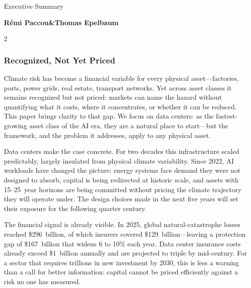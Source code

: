 \clearpage\thispagestyle{chapterstart}

\vspace*{-16mm}
{\displayfont\fontsize{28}{32}\selectfont\color{SEGreen}Executive Summary\par}
\vspace{0.5mm}
{\fontsize{8}{10}\selectfont\bfseries\color{SEBlack}R\'{e}mi Paccou\enspace\textnormal{\&}\enspace Thomas Epelbaum\par}
\vspace{1.5mm}

\begin{multicols}{2}
\setlength{\parskip}{1pt}

\subsubsection*{Recognized, Not Yet Priced}

\noindent Climate risk has become a financial variable for every physical asset---factories, ports, power grids, real estate, transport networks. Yet across asset classes it remains recognized but not priced: markets can name the hazard without quantifying what it costs, where it concentrates, or whether it can be reduced. This paper brings clarity to that gap. We focus on data centers: as the fastest-growing asset class of the AI era, they are a natural place to start---but the framework, and the problem it addresses, apply to any physical asset.

Data centers make the case concrete. For two decades this infrastructure scaled predictably, largely insulated from physical climate variability. Since 2022, AI workloads have changed the picture: energy systems face demand they were not designed to absorb, capital is being redirected at historic scale, and assets with 15--25~year horizons are being committed without pricing the climate trajectory they will operate under. The design choices made in the next five years will set their exposure for the following quarter century.

The financial signal is already visible. In 2025, global natural-catastrophe losses reached \$296~billion, of which insurers covered \$129~billion---leaving a protection gap of \$167~billion that widens 6 to 10\% each year. Data center insurance costs already exceed \$1~billion annually and are projected to triple by mid-century. For a sector that requires trillions in new investment by 2030, this is less a warning than a call for better information: capital cannot be priced efficiently against a risk no one has measured.


\end{multicols}
